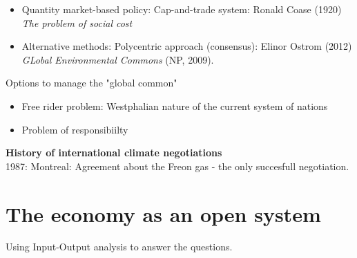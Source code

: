 \begin{multicols}{2}
\begin{itemize}
\begin{itemize}
    \item Quantity market-based policy: Cap-and-trade system: Ronald Coase (1920) \textit{The problem of social cost}
    \item Alternative methods: Polycentric approach (consensus): Elinor Ostrom (2012) \textit{GLobal Environmental Commons} (NP, 2009).
  \end{itemize}
  Options to manage the "global common"
  \begin{itemize}
    \item Free rider problem: Westphalian nature of the current system of nations
    \item Problem of responsibiilty
  \end{itemize}
\end{itemize}
\textbf{History of international climate negotiations}\\
1987: Montreal: Agreement about the Freon gas - the only succesfull negotiation.
\end{multicols}


\section{The economy as an open system}  %
Using Input-Output analysis to answer the questions.
